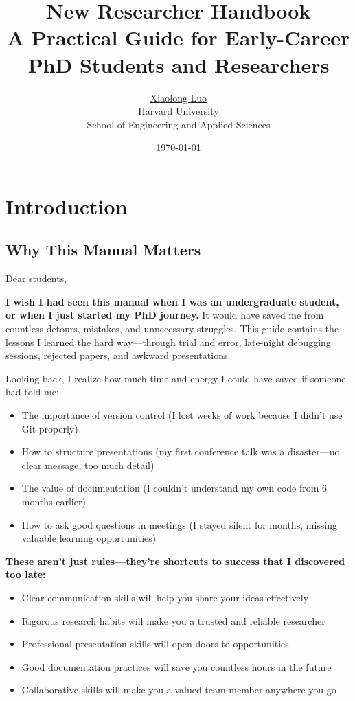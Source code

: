 \documentclass[11pt,a4paper]{article}
\title{\textbf{New Researcher Handbook}\\
\large A Practical Guide for Early-Career PhD Students and Researchers}
\author{\href{https://aaronluo00.github.io/Aaron_Homepage/}{Xiaolong Luo}\\
Harvard University\\
School of Engineering and Applied Sciences}
\date{\today}
\begin{document}
\maketitle

\tableofcontents
\newpage

\section{Introduction}

\subsection{Why This Manual Matters}

Dear students,

\textbf{I wish I had seen this manual when I was an undergraduate student, or when I just started my PhD journey.} It would have saved me from countless detours, mistakes, and unnecessary struggles. This guide contains the lessons I learned the hard way—through trial and error, late-night debugging sessions, rejected papers, and awkward presentations.

Looking back, I realize how much time and energy I could have saved if someone had told me:
\begin{itemize}
    \item The importance of version control (I lost weeks of work because I didn't use Git properly)
    \item How to structure presentations (my first conference talk was a disaster—no clear message, too much detail)
    \item The value of documentation (I couldn't understand my own code from 6 months earlier)
    \item How to ask good questions in meetings (I stayed silent for months, missing valuable learning opportunities)
\end{itemize}

\textbf{These aren't just rules—they're shortcuts to success that I discovered too late:}
\begin{itemize}
    \item Clear communication skills will help you share your ideas effectively
    \item Rigorous research habits will make you a trusted and reliable researcher
    \item Professional presentation skills will open doors to opportunities
    \item Good documentation practices will save you countless hours in the future
    \item Collaborative skills will make you a valued team member anywhere you go
\end{itemize}
\end{document}
